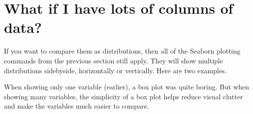 \documentclass[letterpaper,10pt,english]{jupyterBook}
\begin{document}
\section{What if I have lots of columns of data?}
\label{\detokenize{chapter-10-visualization:what-if-i-have-lots-of-columns-of-data}}
\sphinxAtStartPar
If you want to compare them as distributions, then all of the Seaborn plotting commands from the previous section still apply.  They will show multiple distributions side\sphinxhyphen{}by\sphinxhyphen{}side, horizontally or vertically.  Here are two examples.

\begin{sphinxVerbatim}[commandchars=\\\{\}]
    
  
  
\end{sphinxVerbatim}

\noindent{}

\sphinxAtStartPar
When showing only one variable (earlier), a box plot was quite boring.  But when showing many variables, the simplicity of a box plot helps reduce visual clutter and make the variables much easier to compare.

\begin{sphinxVerbatim}[commandchars=\\\{\}]
    
  
  
\end{sphinxVerbatim}
\end{document}

